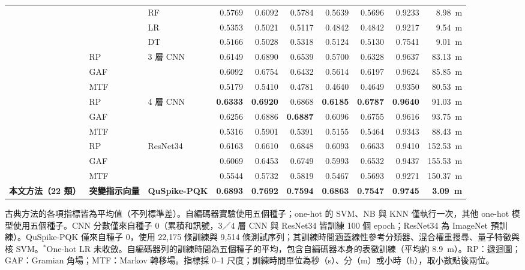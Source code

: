 \documentclass[10pt,a4paper]{article}
\begin{document}
\begin{table}[!ht]
{\begin{tabular}{@{}>{\raggedright\arraybackslash}p{1.9cm}>{\raggedright\arraybackslash}p{1.9cm}lrrrrrrr@{}}
         &  & RF & \(0.5769\) & 0.6092 & 0.5784 & 0.5639 & \(0.5696\) & 0.9233 & 8.98~m \\
         &  & LR & \(0.5353\) & 0.5021 & 0.5117 & 0.4842 & \(0.4842\) & 0.9217 & 9.54~m \\
         &  & DT & \(0.5166\) & 0.5028 & 0.5318 & 0.5124 & \(0.5130\) & 0.7541 & 9.01~m \\
        \midrule
        \multirow{9}{=}{基於影像（22 類）} & RP & \multirow{3}{*}{3 層 CNN} & 0.6149 & 0.6890 & 0.6539 & 0.5700 & 0.6328 & 0.9637 & 83.13~m \\
         & GAF &  & 0.6092 & 0.6754 & 0.6432 & 0.5614 & 0.6197 & 0.9624 & 85.85~m \\
         & MTF &  & 0.5179 & 0.5410 & 0.4781 & 0.4640 & 0.4649 & 0.9350 & 80.53~m \\
                \cmidrule(l){2-10}
         & RP & \multirow{3}{*}{4 層 CNN} & \textbf{0.6333} & \textbf{0.6920} & 0.6868 & \textbf{0.6185} & \textbf{0.6787} & \textbf{0.9640} & 91.03~m \\
         & GAF &  & 0.6256 & 0.6886 & \textbf{0.6887} & 0.6096 & 0.6755 & 0.9616 & 93.75~m \\
         & MTF &  & 0.5316 & 0.5901 & 0.5391 & 0.5155 & 0.5464 & 0.9343 & 88.43~m \\
                \cmidrule(l){2-10}
         & RP & \multirow{3}{*}{ResNet34} & 0.6163 & 0.6610 & 0.6848 & 0.6093 & 0.6633 & 0.9410 & 152.53~m \\
         & GAF &  & 0.6069 & 0.6453 & 0.6749 & 0.5993 & 0.6532 & 0.9437 & 155.53~m \\
         & MTF &  & 0.5544 & 0.5732 & 0.5819 & 0.5467 & 0.5693 & 0.9271 & 150.37~m \\
        \midrule
        \rowcolor{blue!10} \textbf{本文方法（22 類）} & \textbf{突變指示向量} & \textbf{QuSpike-PQK} & \textbf{0.6893} & \textbf{0.7692} & \textbf{0.7594} & \textbf{0.6863} & \textbf{0.7547} & \textbf{0.9745} & \textbf{3.09~m} \\
        \bottomrule
    \end{tabular}}
    \par\smallskip
    \begin{minipage}{\textwidth}
        \footnotesize
        古典方法的各項指標皆為平均值（不列標準差）。自編碼器實驗使用五個種子；one-hot 的 SVM、NB 與 KNN 僅執行一次，其他 one-hot 模型使用五個種子。CNN 分數僅來自種子 0（累積和訊號，3／4 層 CNN 與 ResNet34 皆訓練 100 個 epoch；ResNet34 為 ImageNet 預訓練）。QuSpike-PQK 僅來自種子 0，使用 22,175 條訓練與 9,514 條測試序列；其訓練時間涵蓋線性參考分類器、混合權重搜尋、量子特徵與核 SVM。$^{*}$One-hot LR 未收斂。自編碼器列的訓練時間為五個種子的平均，包含自編碼器本身的表徵訓練（平均約 8.9~m）。RP：遞迴圖；GAF：Gramian 角場；MTF：Markov 轉移場。指標採 0--1 尺度；訓練時間單位為秒（s）、分（m）或小時（h），取小數點後兩位。
    \end{minipage}
\end{table}
\end{document}
